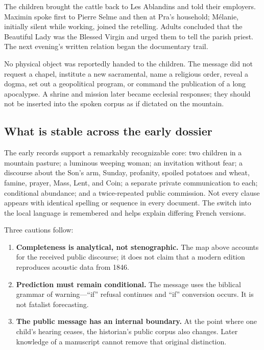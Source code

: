 The children brought the cattle back to Les Ablandins and told their employers. Maximin spoke first to Pierre Selme and then at Pra's household; Mélanie, initially silent while working, joined the retelling. Adults concluded that the Beautiful Lady was the Blessed Virgin and urged them to tell the parish priest. The next evening's written relation began the documentary trail.

No physical object was reportedly handed to the children. The message did not request a chapel, institute a new sacramental, name a religious order, reveal a dogma, set out a geopolitical program, or command the publication of a long apocalypse. A shrine and mission later became ecclesial responses; they should not be inserted into the spoken corpus as if dictated on the mountain.

\subsection{What is stable across the early dossier}

The early records support a remarkably recognizable core: two children in a mountain pasture; a luminous weeping woman; an invitation without fear; a discourse about the Son's arm, Sunday, profanity, spoiled potatoes and wheat, famine, prayer, Mass, Lent, and Coin; a separate private communication to each; conditional abundance; and a twice-repeated public commission. Not every clause appears with identical spelling or sequence in every document. The switch into the local language is remembered and helps explain differing French versions.

Three cautions follow:

\begin{enumerate}
  \item \textbf{Completeness is analytical, not stenographic.} The map above accounts for the received public discourse; it does not claim that a modern edition reproduces acoustic data from 1846.
  \item \textbf{Prediction must remain conditional.} The message uses the biblical grammar of warning---``if'' refusal continues and ``if'' conversion occurs. It is not fatalist forecasting.
  \item \textbf{The public message has an internal boundary.} At the point where one child's hearing ceases, the historian's public corpus also changes. Later knowledge of a manuscript cannot remove that original distinction.
\end{enumerate}

